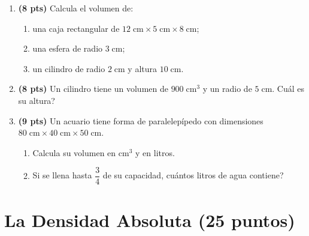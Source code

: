 \documentclass[12pt, letterpaper]{article}
\begin{document}
\begin{enumerate}[leftmargin=*]
  \item \textbf{(8 pts)} Calcula el volumen de:
        \begin{enumerate}[label=\alph*)]
          \item una caja rectangular de $12\;\text{cm} \times 5\;\text{cm} \times 8\;\text{cm}$;
          \item una esfera de radio $3\;\text{cm}$;
          \item un cilindro de radio $2\;\text{cm}$ y altura $10\;\text{cm}$.
        \end{enumerate}

  \item \textbf{(8 pts)} Un cilindro tiene un volumen de $900\;\text{cm}^3$ y un radio de $5\;\text{cm}$. \textquestiondown Cuál es su altura?

  \item \textbf{(9 pts)} Un acuario tiene forma de paralelepípedo con dimensiones $80\;\text{cm} \times 40\;\text{cm} \times 50\;\text{cm}$.
        \begin{enumerate}[label=\alph*)]
          \item Calcula su volumen en $\text{cm}^3$ y en litros.
          \item Si se llena hasta $\dfrac{3}{4}$ de su capacidad, \textquestiondown cuántos litros de agua contiene?
        \end{enumerate}
\end{enumerate}

\newpage

\section{La Densidad Absoluta (25 puntos)}
\end{document}
